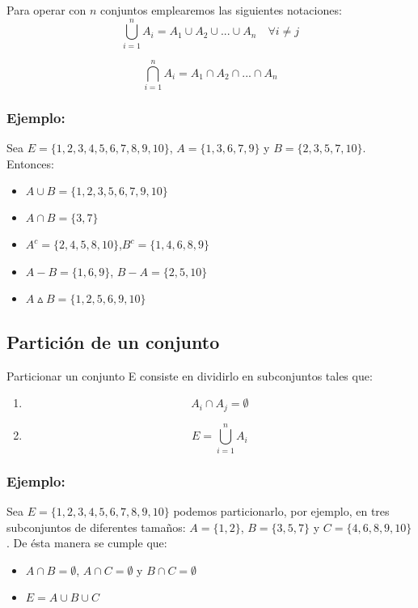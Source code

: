 Para operar con $n$ conjuntos emplearemos las siguientes notaciones:
$$
\bigcup_{i=1}^n A_i = A_1 \cup A_2 \cup ... \cup A_n \quad \forall i \not = j
$$

$$
\bigcap_{i=1}^n A_i = A_1 \cap A_2 \cap ... \cap A_n
$$

\subsubsection*{Ejemplo:}
Sea $E=\lbrace 1,2,3,4,5,6,7,8,9,10\rbrace$, $A=\lbrace1,3,6,7,9\rbrace$ y $B=\lbrace2,3,5,7,10\rbrace$. Entonces:
\begin{itemize}
\item $A \cup B =\lbrace 1,2,3,5,6,7,9,10 \rbrace$
\item $A \cap B =\lbrace 3,7 \rbrace$
\item $A^c=\lbrace 2,4,5,8,10 \rbrace$,\quad $B^c= \lbrace 1,4,6,8,9\rbrace$
\item $A-B=\lbrace 1,6,9 \rbrace$, \quad $B-A=\lbrace 2,5,10 \rbrace$
\item $A\vartriangle B= \lbrace 1,2,5,6,9,10 \rbrace$

\end{itemize}

\subsection*{Partición de un conjunto}
Particionar un conjunto E consiste en dividirlo en subconjuntos tales que:
\begin{enumerate}
\item $$A_i \cap A_j =\emptyset$$
\item $$E=\bigcup_{i=1}^n A_i$$
\end{enumerate}

\subsubsection*{Ejemplo:}
Sea $E=\lbrace 1,2,3,4,5,6,7,8,9,10\rbrace$ podemos particionarlo, por ejemplo, en tres subconjuntos de diferentes tamaños: $A=\lbrace 1,2 \rbrace$, $B=\lbrace 3,5,7 \rbrace$ y $C=\lbrace 4,6,8,9,10 \rbrace$. De ésta manera se cumple que:
\begin{itemize}
\item  $A \cap B =\emptyset$, $A \cap C =\emptyset$ y $B \cap C =\emptyset$
\item  $E= A \cup B \cup C$
\end{itemize}

